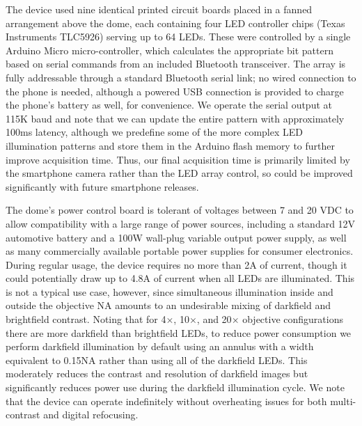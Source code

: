The device used nine identical printed circuit boards placed in a fanned arrangement above the dome, each containing four LED controller chips (Texas Instruments TLC5926) serving up to 64 LEDs. These were controlled by a single Arduino Micro micro-controller, which calculates the appropriate bit pattern based on serial commands from an included Bluetooth transceiver. The array is fully addressable through a standard Bluetooth serial link; no wired connection to the phone is needed, although a powered USB connection is provided to charge the phone’s battery as well, for convenience. We operate the serial output at 115K baud and note that we can update the entire pattern with approximately 100ms latency, although we predefine some of the more complex LED illumination patterns and store them in the Arduino flash memory to further improve acquisition time. Thus, our final acquisition time is primarily limited by the smartphone camera rather than the LED array control, so could be improved significantly with future smartphone releases.

The dome's power control board is tolerant of voltages between 7 and 20 VDC to allow compatibility with a large range of power sources, including a standard 12V automotive battery and a 100W wall-plug variable output power supply, as well as many commercially available portable power supplies for consumer electronics. During regular usage, the device requires no more than 2A of current, though it could potentially draw up to 4.8A of current when all LEDs are illuminated. This is not a typical use case, however, since simultaneous illumination inside and outside the objective NA amounts to an undesirable mixing of darkfield and brightfield contrast. Noting that for 4$\times$, 10$\times$, and 20$\times$ objective configurations there are more darkfield than brightfield LEDs, to reduce power consumption we perform darkfield illumination by default using an annulus with a width equivalent to 0.15NA rather than using all of the darkfield LEDs. This moderately reduces the contrast and resolution of darkfield images but significantly reduces power use during the darkfield illumination cycle. We note that the device can operate indefinitely without overheating issues for both multi-contrast and digital refocusing.

